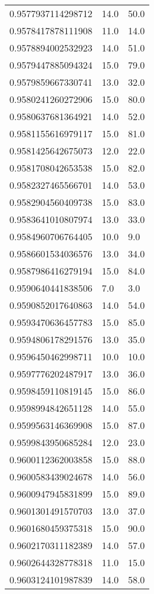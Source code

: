 \begin{center}
\begin{supertabular}[H]{p{0.30\textwidth}p{0.05\textwidth}p{0.05\textwidth}}
0.9577937114298712 & 14.0 & 50.0 \\ 
0.9578417878111908 & 11.0 & 14.0 \\ 
0.9578894002532923 & 14.0 & 51.0 \\ 
0.9579447885094324 & 15.0 & 79.0 \\ 
0.9579859667330741 & 13.0 & 32.0 \\ 
0.9580241260272906 & 15.0 & 80.0 \\ 
0.9580637681364921 & 14.0 & 52.0 \\ 
0.9581155616979117 & 15.0 & 81.0 \\ 
0.9581425642675073 & 12.0 & 22.0 \\ 
0.9581708042653538 & 15.0 & 82.0 \\ 
0.9582327465566701 & 14.0 & 53.0 \\ 
0.9582904560409738 & 15.0 & 83.0 \\ 
0.9583641010807974 & 13.0 & 33.0 \\ 
0.9584960706764405 & 10.0 & 9.0 \\ 
0.9586601534036576 & 13.0 & 34.0 \\ 
0.9587986416279194 & 15.0 & 84.0 \\ 
0.9590640441838506 & 7.0 & 3.0 \\ 
0.9590852017640863 & 14.0 & 54.0 \\ 
0.9593470636457783 & 15.0 & 85.0 \\ 
0.9594806178291576 & 13.0 & 35.0 \\ 
0.9596450462998711 & 10.0 & 10.0 \\ 
0.9597776202487917 & 13.0 & 36.0 \\ 
0.9598459110819145 & 15.0 & 86.0 \\ 
0.9598994842651128 & 14.0 & 55.0 \\ 
0.9599563146369908 & 15.0 & 87.0 \\ 
0.9599843950685284 & 12.0 & 23.0 \\ 
0.9600112362003858 & 15.0 & 88.0 \\ 
0.9600583439024678 & 14.0 & 56.0 \\ 
0.9600947945831899 & 15.0 & 89.0 \\ 
0.9601301491570703 & 13.0 & 37.0 \\ 
0.9601680459375318 & 15.0 & 90.0 \\ 
0.9602170311182389 & 14.0 & 57.0 \\ 
0.9602644328778318 & 11.0 & 15.0 \\ 
0.9603124101987839 & 14.0 & 58.0 \\ 

\end{supertabular}
\end{center}
